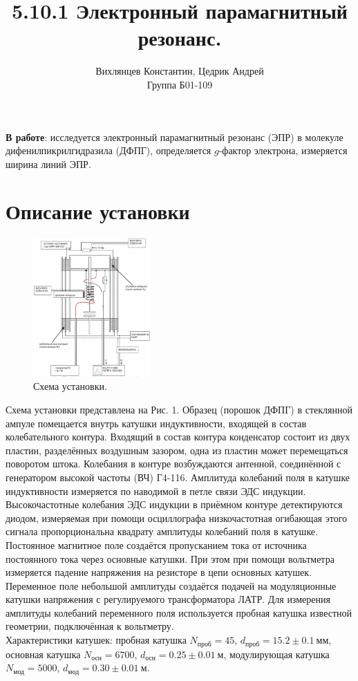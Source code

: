 \documentclass[a4paper,12pt]{article}
\author{Вихлянцев Константин, Цедрик Андрей\\
Группа Б01-109}
\title{5.10.1 Электронный парамагнитный резонанс.}
\date{}
\begin{document}
\maketitle
\textbf{В работе}: исследуется электронный парамагнитный резонанс (ЭПР) в молекуле дифенилпикрилгидразила (ДФПГ), определяется $g$-фактор электрона, измеряется ширина линий ЭПР.
\section*{Описание установки}
\begin{figure}
\includegraphics[width = 0.4\textwidth]{1.png}
\centering
\caption{Схема установки.}
\end{figure}
Схема установки представлена на Рис. 1. Образец (порошок ДФПГ) в стеклянной ампуле помещается внутрь катушки индуктивности, входящей в состав колебательного контура. Входящий в состав контура конденсатор состоит из двух пластин, разделённых воздушным зазором, одна из пластин может перемещаться поворотом штока. Колебания в контуре возбуждаются антенной, соединённой с генератором высокой частоты (ВЧ) Г4-116. Амплитуда колебаний поля в катушке индуктивности
измеряется по наводимой в петле связи ЭДС индукции. Высокочастотные колебания ЭДС
индукции в приёмном контуре детектируются диодом, измеряемая при помощи
осциллографа низкочастотная огибающая этого сигнала пропорциональна квадрату
амплитуды колебаний поля в катушке.\\
Постоянное магнитное поле создаётся пропусканием тока от источника постоянного тока через основные катушки. При этом при помощи вольтметра измеряется падение напряжения на резисторе в цепи основных катушек. Переменное поле небольшой амплитуды создаётся подачей на модуляционные катушки напряжения с регулируемого трансформатора ЛАТР. Для измерения амплитуды колебаний переменного поля используется пробная катушка известной геометрии, подключённая к вольтметру.\\
Характеристики катушек: пробная катушка $N_{\text{проб}} = 45$, $d_{\text{проб}} = 15.2\pm 0.1~\text{мм}$, основная катушка $N_{\text{осн}} = 6700$, $d_{\text{осн}} = 0.25\pm 0.01~\text{м}$,  модулирующая катушка $N_{\text{мод}} = 5000$, $d_{\text{мод}} = 0.30\pm 0.01~\text{м}$.
\end{document}
